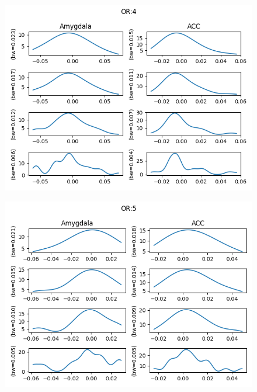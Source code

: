\documentclass[twoside,12pt]{article}
\begin{document}
\begin{enumerate}[label*=\arabic*.]
\begin{figure}[H]
    \end{figure}
 \begin{figure}[H]
        \centering
        \includegraphics[width=\textwidth, height=\textwidth]{images/1D OR4 amyg+acc.png}
    \end{figure}
 \begin{figure}[H]
        \centering
        \includegraphics[width=\textwidth, height=\textwidth]{images/1D OR5 amyg+acc.png}
    \end{figure}


\end{enumerate}
\end{document}
